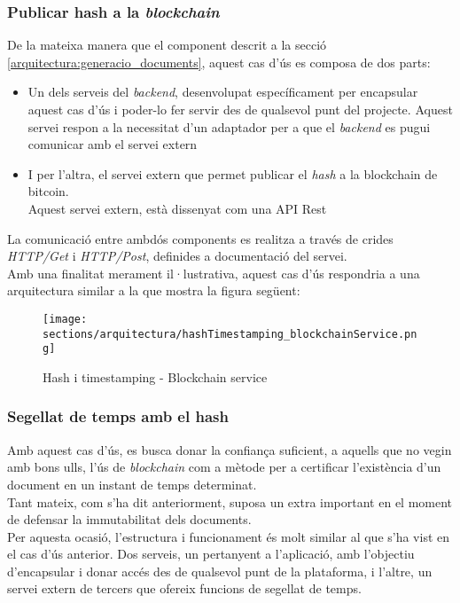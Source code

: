 \subsubsection{Publicar hash a la \textit{blockchain}}
De la mateixa manera que el component descrit a la secció \ref{arquitectura:generacio_documents}, aquest cas d'ús es composa de dos parts:
\begin{itemize}
    \item Un dels serveis del \textit{backend}, desenvolupat específicament per encapsular aquest cas d'ús i poder-lo fer servir des de qualsevol punt del projecte.
    Aquest servei respon a la necessitat d'un adaptador per a que el \textit{backend} es pugui comunicar amb el servei extern
    \item I per l'altra, el servei extern que permet publicar el \textit{hash} a la blockchain de bitcoin.\\
    Aquest servei extern, està dissenyat com una API Rest
\end{itemize}
La comunicació entre ambdós components es realitza a través de crides \textit{HTTP/Get} i \textit{HTTP/Post}, definides a documentació del servei.\\
\newline Amb una finalitat merament il·lustrativa, aquest cas d'ús respondria a una arquitectura similar a la que mostra la figura següent:
\begin{figure}[h]
\texttt{[image: sections/arquitectura/hashTimestamping\_blockchainService.png]}
\centering
\caption{Hash i timestamping - Blockchain service}
\label{fig:hash_timestamping_blockchainService}
\end{figure}
\subsubsection{Segellat de temps amb el hash}
Amb aquest cas d'ús, es busca donar la confiança suficient, a aquells que no vegin amb bons ulls, l'ús de \textit{blockchain} com a mètode per a certificar l'existència d'un document en un instant de temps determinat.\\
Tant mateix, com s'ha dit anteriorment, suposa un extra important en el moment de defensar la immutabilitat dels documents.\\
\newline Per aquesta ocasió, l'estructura i funcionament és molt similar al que s'ha vist en el cas d'ús anterior. Dos serveis, un pertanyent a l'aplicació, amb l'objectiu d'encapsular i donar accés des de qualsevol punt de la plataforma, i l'altre, un servei extern de tercers que ofereix funcions de segellat de temps.
